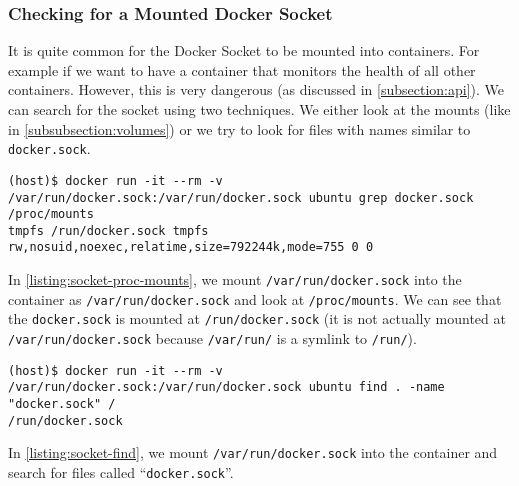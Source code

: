 \subsubsection{Checking for a Mounted Docker Socket}\label{subsubsection:searching-socket}
It is quite common for the Docker Socket to be mounted into containers. For example if we want to have a container that monitors the health of all other containers. However, this is very dangerous (as discussed in \autoref{subsection:api}). We can search for the socket using two techniques. We either look at the mounts (like in \autoref{subsubsection:volumes}) or we try to look for files with names similar to \lstinline{docker.sock}.

\begin{lstlisting}[caption={\lstinline{docker.sock} in \lstinline{/proc/mounts}.},captionpos=b,label={listing:socket-proc-mounts}]
(host)$ docker run -it --rm -v /var/run/docker.sock:/var/run/docker.sock ubuntu grep docker.sock /proc/mounts
tmpfs /run/docker.sock tmpfs rw,nosuid,noexec,relatime,size=792244k,mode=755 0 0
\end{lstlisting}

In \autoref{listing:socket-proc-mounts}, we mount \lstinline{/var/run/docker.sock} into the container as \lstinline{/var/run/docker.sock} and look at \lstinline{/proc/mounts}. We can see that the \lstinline{docker.sock} is mounted at \lstinline{/run/docker.sock} (it is not actually mounted at \lstinline{/var/run/docker.sock} because \lstinline{/var/run/} is a symlink to \lstinline{/run/}).

\medskip

\begin{lstlisting}[caption={Running \lstinline{find} to search for \lstinline{docker.sock}.},captionpos=b, label={listing:socket-find}]
(host)$ docker run -it --rm -v /var/run/docker.sock:/var/run/docker.sock ubuntu find . -name "docker.sock" /
/run/docker.sock
\end{lstlisting}

In \autoref{listing:socket-find}, we mount \lstinline{/var/run/docker.sock} into the container and search for files called ``\lstinline{docker.sock}''.
